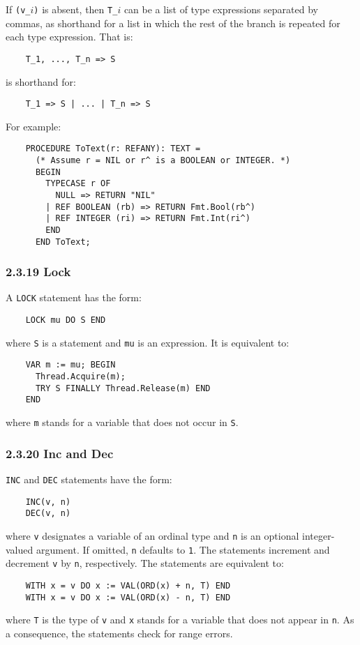 \documentclass[10pt]{article}
\begin{document}
If \verb|(v_|$i$\verb|)| is absent, then \verb|T_|$i$ can be a list of type
expressions separated by commas, as shorthand for a list in which the rest of
the branch is repeated for each type expression.  That is:
\begin{verbatim}
    T_1, ..., T_n => S
\end{verbatim}
is shorthand for:
\begin{verbatim}
    T_1 => S | ... | T_n => S
\end{verbatim}

For example:
\begin{verbatim}
    PROCEDURE ToText(r: REFANY): TEXT =
      (* Assume r = NIL or r^ is a BOOLEAN or INTEGER. *)
      BEGIN
        TYPECASE r OF
          NULL => RETURN "NIL"
        | REF BOOLEAN (rb) => RETURN Fmt.Bool(rb^)
        | REF INTEGER (ri) => RETURN Fmt.Int(ri^)
        END
      END ToText;
\end{verbatim}

\subsubsection*{2.3.19 Lock}

A \verb|LOCK| statement has the form:
\begin{verbatim}
    LOCK mu DO S END
\end{verbatim}
where \verb|S| is a statement and \verb|mu| is an expression.  It is
equivalent to:
\begin{verbatim}
    VAR m := mu; BEGIN
      Thread.Acquire(m);
      TRY S FINALLY Thread.Release(m) END
    END
\end{verbatim}
where \verb|m| stands for a variable that does not occur in \verb|S|.

\subsubsection*{2.3.20 Inc and Dec}

\verb|INC| and \verb|DEC| statements have the form:
\begin{verbatim}
    INC(v, n)
    DEC(v, n)
\end{verbatim}
where \verb|v| designates a variable of an ordinal type and \verb|n| is an
optional integer-valued argument.  If omitted, \verb|n| defaults to \verb|1|.
The statements increment and decrement \verb|v| by \verb|n|, respectively.
The statements are equivalent to:
\begin{verbatim}
    WITH x = v DO x := VAL(ORD(x) + n, T) END
    WITH x = v DO x := VAL(ORD(x) - n, T) END
\end{verbatim}
where \verb|T| is the type of \verb|v| and \verb|x| stands for a variable that
does not appear in \verb|n|.  As a consequence, the statements check for range
errors.
\end{document}

